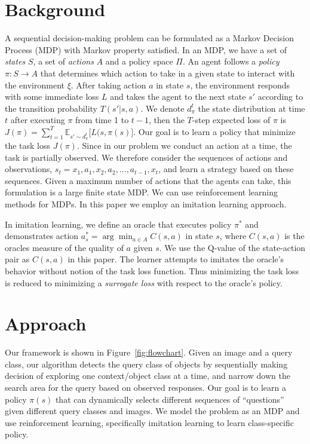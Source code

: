 \section{Background}
A sequential decision-making problem can be formulated as a Markov Decision Process (MDP) with Markov property satisfied. In an MDP, we have a set of \textit{states} $S$, a set of \textit{actions} $A$ and a policy space $\Pi$. An agent follows a \textit{policy} $\pi: S \rightarrow A$ that determines which action to take in a given state to interact with the environment $\xi$. After taking action $a$ in state $s$, the environment responds with some immediate loss $L$ and takes the agent to the next state $s'$ according to the transition probability $T(s'|s,a)$. We denote $d_\pi^t$ the state distribution at time $t$ after executing $\pi$ from time 1 to $t-1$, then the $T$-step expected loss of $\pi$ is $J(\pi) = \sum_{t=1}^T \mathbb{E}_{s'\sim d_\pi^t} \big[L(s, \pi(s)\big]  $.  Our goal is to learn a policy that minimize the task loss $J(\pi)$. Since in our problem we conduct an action at a time, the task is partially observed. We therefore consider the sequences of actions and observations, $s_t = x_1, a_1, x_2, a_2, ..., a_{t-1}, x_t$, and learn a strategy based on these sequences. Given a maximum number of actions that the agents can take, this formulation is a large finite state MDP. We can use reinforcement learning methods for MDPs. In this paper we employ an imitation learning approach.

In imitation learning, we define an oracle that executes policy $\pi^*$ and demonstrates action $a_s^* = \arg \min_{a\in A} C(s,a)$ in state $s$, where $C(s,a)$ is the oracles measure of the quality of $a$ given $s$. We use the Q-value of the state-action pair as $C(s,a)$ in this paper. The learner attempts to imitates the oracle's behavior without notion of the task loss function. Thus minimizing the task loss is reduced to minimizing a \textit{surrogate loss} with respect to the oracle's policy.

\section{Approach}

Our framework is shown in Figure~\ref{fig:flowchart}. Given an image and a query class, our algorithm detects the query class of objects by sequentially making decision of exploring one context/object class at a time, and narrow down the search area for the query based on observed responses. Our goal is to learn a policy $\pi(s)$ that can dynamically selects different sequences of ``questions''  given different query classes and images. We model the problem as an MDP and use reinforcement learning, specifically imitation learning to learn class-specific policy. 

